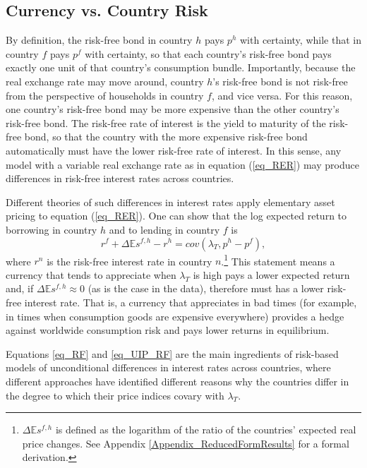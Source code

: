 \documentclass{ar-1col}
\begin{document}
\begin{textbox}[h]
\section{Currency vs. Country Risk}
\end{textbox}
By definition, the risk-free bond in country $h$ pays $p^h$ with
certainty, while that in country $f$ pays $p^f$ with certainty, so
that each country's risk-free bond pays exactly one unit of that
country's consumption bundle. Importantly, because the real exchange
rate may move around, country $h$'s risk-free bond is not risk-free
from the perspective of households in country $f$, and vice versa. For
this reason, one country's risk-free bond may be more expensive than
the other country's risk-free bond. The risk-free rate of interest is
the yield to maturity of the risk-free bond, so that the country with
the more expensive risk-free bond automatically must have the lower
risk-free rate of interest. In this sense, any model with a variable
real exchange rate as in equation (\ref{eq_RER}) may produce
differences in risk-free interest rates across countries.

Different theories of such differences in interest rates apply
elementary asset pricing to equation (\ref{eq_RER}). One can show that
the log expected return to borrowing in country $h$ and to lending in
country $f$ is
\begin{equation}
  r^{f} + \Delta \mathbb{E} s^{f,h} - r^{h} =cov\left( \lambda _{T},p^{h}-p^{f}\right),
  \label{eq_UIP_RF}
\end{equation}%
where $r^{n}$ is the risk-free interest rate in country
$n$.\footnote{$\Delta\mathbb{E}s^{f,h}$ is defined as the logarithm of
  the ratio of the countries' expected real price changes. See
  Appendix \ref{Appendix_ReducedFormResults} for a formal derivation.}
This statement means a currency that tends to appreciate when
$\lambda_T$ is high pays a lower expected return and, if
$\Delta \mathbb{E} s^{f,h}\approx0$ (as is the case in the data),
therefore must has a lower risk-free interest rate. That is, a
currency that appreciates in bad times (for example, in times when
consumption goods are expensive everywhere) provides a hedge against
worldwide consumption risk and pays lower returns in equilibrium.

Equations \eqref{eq_RF} and \eqref{eq_UIP_RF} are the main ingredients
of risk-based models of unconditional differences in interest rates
across countries, where different approaches have identified different
reasons why the countries differ in the degree to which their price
indices covary with $\lambda_T$.
\end{document}
